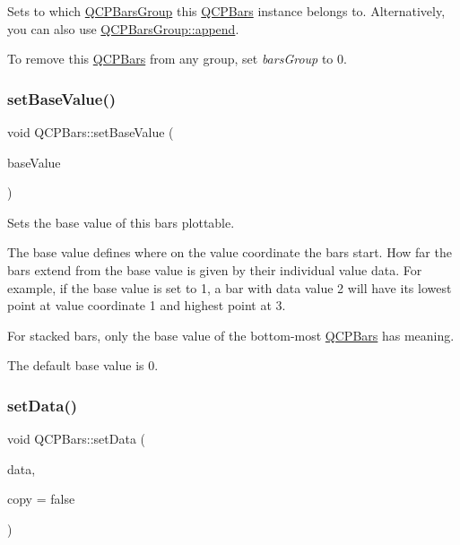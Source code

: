 Sets to which \mbox{\hyperlink{class_q_c_p_bars_group}{Q\+C\+P\+Bars\+Group}} this \mbox{\hyperlink{class_q_c_p_bars}{Q\+C\+P\+Bars}} instance belongs to. Alternatively, you can also use \mbox{\hyperlink{class_q_c_p_bars_group_a809ed63cc4ff7cd5b0b8c96b470163d3}{Q\+C\+P\+Bars\+Group\+::append}}.

To remove this \mbox{\hyperlink{class_q_c_p_bars}{Q\+C\+P\+Bars}} from any group, set {\itshape bars\+Group} to 0. \mbox{\label{class_q_c_p_bars_a574ec7eb7537566df1a28ff085d75623}} 
\subsubsection{\texorpdfstring{set\+Base\+Value()}{setBaseValue()}}
{\footnotesize\ttfamily void Q\+C\+P\+Bars\+::set\+Base\+Value (\begin{DoxyParamCaption}\item[{double}]{base\+Value }\end{DoxyParamCaption})}

Sets the base value of this bars plottable.

The base value defines where on the value coordinate the bars start. How far the bars extend from the base value is given by their individual value data. For example, if the base value is set to 1, a bar with data value 2 will have its lowest point at value coordinate 1 and highest point at 3.

For stacked bars, only the base value of the bottom-\/most \mbox{\hyperlink{class_q_c_p_bars}{Q\+C\+P\+Bars}} has meaning.

The default base value is 0. \mbox{\label{class_q_c_p_bars_aa3435aab19e0a49e4e7b41bd36a8d96b}} 
\subsubsection{\texorpdfstring{set\+Data()}{setData()}\hspace{0.1cm}{\footnotesize\ttfamily [1/2]}}
{\footnotesize\ttfamily void Q\+C\+P\+Bars\+::set\+Data (\begin{DoxyParamCaption}\item[{\mbox{\hyperlink{qcustomplot_8h_aa846c77472cae93def9f1609d0c57191}{Q\+C\+P\+Bar\+Data\+Map}} $\ast$}]{data,  }\item[{bool}]{copy = {\ttfamily false} }\end{DoxyParamCaption})}

